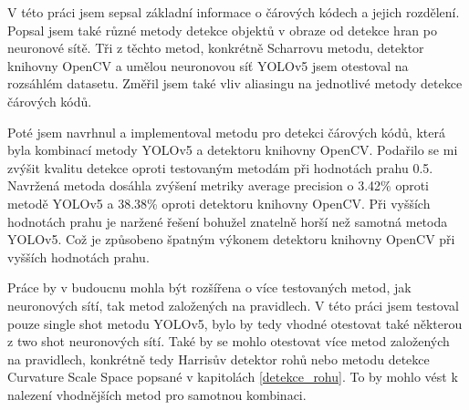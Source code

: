 V této práci jsem sepsal základní informace o čárových kódech a jejich rozdělení. Popsal jsem také různé metody detekce objektů v obraze od detekce hran po neuronové sítě. Tři z těchto metod, konkrétně Scharrovu metodu, detektor knihovny OpenCV a umělou neuronovou síť YOLOv5 jsem otestoval na rozsáhlém datasetu. Změřil jsem také vliv aliasingu na jednotlivé metody detekce čárových kódů.

Poté jsem navrhnul a implementoval metodu pro detekci čárových kódů, která byla kombinací metody YOLOv5 a detektoru knihovny OpenCV. Podařilo se mi zvýšit kvalitu detekce oproti testovaným metodám při hodnotách prahu 0.5. Navržená metoda dosáhla zvýšení metriky average precision o 3.42\% oproti metodě YOLOv5 a 38.38\% oproti detektoru knihovny OpenCV. Při vyšších hodnotách prahu je naržené řešení bohužel znatelně horší než samotná metoda YOLOv5. Což je způsobeno špatným výkonem detektoru knihovny OpenCV při vyšších hodnotách prahu.

Práce by v budoucnu mohla být rozšířena o více testovaných metod, jak neuronových sítí, tak metod založených na pravidlech. V této práci jsem testoval pouze single shot metodu YOLOv5, bylo by tedy vhodné otestovat také některou z two shot neuronových sítí. Také by se mohlo otestovat více metod založených na pravidlech, konkrétně tedy Harrisův detektor rohů nebo metodu detekce Curvature Scale Space popsané v kapitolách \ref{detekce_rohu}. To by mohlo vést k nalezení vhodnějších metod pro samotnou kombinaci.








%
